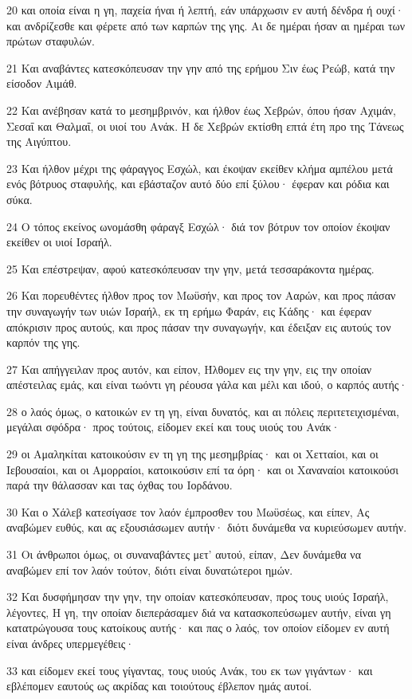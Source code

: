 \par 20 και οποία είναι η γη, παχεία ήναι ή λεπτή, εάν υπάρχωσιν εν αυτή δένδρα ή ουχί· και ανδρίζεσθε και φέρετε από των καρπών της γης. Αι δε ημέραι ήσαν αι ημέραι των πρώτων σταφυλών.
\par 21 Και αναβάντες κατεσκόπευσαν την γην από της ερήμου Σιν έως Ρεώβ, κατά την είσοδον Αιμάθ.
\par 22 Και ανέβησαν κατά το μεσημβρινόν, και ήλθον έως Χεβρών, όπου ήσαν Αχιμάν, Σεσαΐ και Θαλμαΐ, οι υιοί του Ανάκ. Η δε Χεβρών εκτίσθη επτά έτη προ της Τάνεως της Αιγύπτου.
\par 23 Και ήλθον μέχρι της φάραγγος Εσχώλ, και έκοψαν εκείθεν κλήμα αμπέλου μετά ενός βότρυος σταφυλής, και εβάσταζον αυτό δύο επί ξύλου· έφεραν και ρόδια και σύκα.
\par 24 Ο τόπος εκείνος ωνομάσθη φάραγξ Εσχώλ· διά τον βότρυν τον οποίον έκοψαν εκείθεν οι υιοί Ισραήλ.
\par 25 Και επέστρεψαν, αφού κατεσκόπευσαν την γην, μετά τεσσαράκοντα ημέρας.
\par 26 Και πορευθέντες ήλθον προς τον Μωϋσήν, και προς τον Ααρών, και προς πάσαν την συναγωγήν των υιών Ισραήλ, εκ τη ερήμω Φαράν, εις Κάδης· και έφεραν απόκρισιν προς αυτούς, και προς πάσαν την συναγωγήν, και έδειξαν εις αυτούς τον καρπόν της γης.
\par 27 Και απήγγειλαν προς αυτόν, και είπον, Ήλθομεν εις την γην, εις την οποίαν απέστειλας εμάς, και είναι τωόντι γη ρέουσα γάλα και μέλι και ιδού, ο καρπός αυτής·
\par 28 ο λαός όμως, ο κατοικών εν τη γη, είναι δυνατός, και αι πόλεις περιτετειχισμέναι, μεγάλαι σφόδρα· προς τούτοις, είδομεν εκεί και τους υιούς του Ανάκ·
\par 29 οι Αμαληκίται κατοικούσιν εν τη γη της μεσημβρίας· και οι Χετταίοι, και οι Ιεβουσαίοι, και οι Αμορραίοι, κατοικούσιν επί τα όρη· και οι Χαναναίοι κατοικούσι παρά την θάλασσαν και τας όχθας του Ιορδάνου.
\par 30 Και ο Χάλεβ κατεσίγασε τον λαόν έμπροσθεν του Μωϋσέως, και είπεν, Ας αναβώμεν ευθύς, και ας εξουσιάσωμεν αυτήν· διότι δυνάμεθα να κυριεύσωμεν αυτήν.
\par 31 Οι άνθρωποι όμως, οι συναναβάντες μετ' αυτού, είπαν, Δεν δυνάμεθα να αναβώμεν επί τον λαόν τούτον, διότι είναι δυνατώτεροι ημών.
\par 32 Και δυσφήμησαν την γην, την οποίαν κατεσκόπευσαν, προς τους υιούς Ισραήλ, λέγοντες, Η γη, την οποίαν διεπεράσαμεν διά να κατασκοπεύσωμεν αυτήν, είναι γη κατατρώγουσα τους κατοίκους αυτής· και πας ο λαός, τον οποίον είδομεν εν αυτή είναι άνδρες υπερμεγέθεις·
\par 33 και είδομεν εκεί τους γίγαντας, τους υιούς Ανάκ, του εκ των γιγάντων· και εβλέπομεν εαυτούς ως ακρίδας και τοιούτους έβλεπον ημάς αυτοί.

